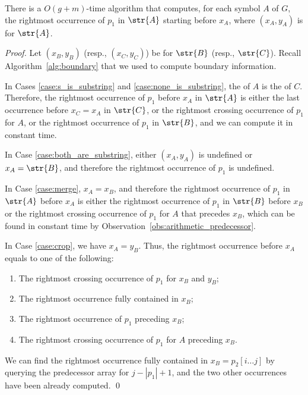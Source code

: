 \begin{proposition}\label{claim:preceding_x_A}
There is a $O(g+m)$-time algorithm that computes, for each symbol $A$ of $G$, the rightmost occurrence of $p_1$ in $\str{A}$ starting before $x_A$, where $(x_A,y_A)$ is  for $\str{A}$. 
\end{proposition}    
\begin{proof}   
Let $(x_B,y_B)$ (resp., $(x_C,y_C)$) be  for $\str{B}$ (resp., $\str{C}$). Recall Algorithm~\ref{alg:boundary} that we used to compute boundary information. 

In Cases \ref{case:s_is_substring} and \ref{case:none_is_substring}, the  of $A$ is the  of $C$. Therefore, the rightmost occurrence of $p_1$ before $x_A$ in $\str{A}$ is either the last occurrence before $x_C=x_A$ in $\str{C}$, or the rightmost crossing occurrence of $p_1$ for $A$, or the rightmost occurrence of $p_1$ in $\str{B}$, and we can compute it in constant time.

In Case \ref{case:both_are_substring}, either $(x_A,y_A)$ is undefined or $x_A = \str{B}$, and therefore the rightmost occurrence of $p_1$ is undefined. 

In Case \ref{case:merge}, $x_A=x_B$, and therefore the rightmost occurrence of $p_1$ in $\str{A}$ before $x_A$ is either the rightmost occurrence of $p_1$ in $\str{B}$ before $x_B$ or the rightmost crossing occurrence of $p_1$ for $A$ that precedes $x_B$, which can be found in constant time by Observation~\ref{obs:arithmetic_predecessor}. 

In Case \ref{case:crop}, we have $x_A=y_B$. Thus, the rightmost occurrence before $x_A$ equals to one of the following: 
        \begin{enumerate}
            \item The rightmost crossing occurrence of $p_1$ for $x_B$ and $y_B$; 
            \item The rightmost occurrence fully contained in $x_B$; 
            \item The rightmost occurrence of $p_1$ preceding $x_B$;
            \item The rightmost crossing occurrence of $p_1$ for $A$ preceding $x_B$.
        \end{enumerate}
We can find the rightmost occurrence fully contained in $x_B=p_2[i \dots j]$ by querying the predecessor array for $j-|p_1|+1$, and the two other occurrences have been already computed. 
\qed
\end{proof}
    
